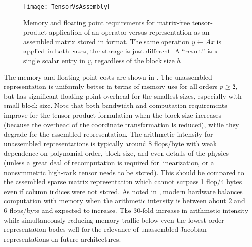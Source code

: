 \begin{figure}
  \centering
  \texttt{[image: TensorVsAssembly]}
  \caption{Memory and floating point requirements for matrix-free tensor-product application of an operator versus representation as an assembled matrix stored in \BAIJ[b] format.
    The same operation $y \gets A x$ is applied in both cases, the storage is just different.
    A ``result'' is a single scalar entry in $y$, regardless of the block size $b$.}\label{fig:tensorasm}
\end{figure}

The memory and floating point costs are shown in .
The unassembled representation is uniformly better in terms of memory use for all orders $p \ge 2$, but has significant floating point overhead for the smallest sizes, especially with small block size.
Note that both bandwidth and computation requirements improve for the tensor product formulation when the block size increases (because the overhead of the coordinate transformation is reduced), while they degrade for the assembled representation.
The arithmetic intensity for unassembled representations is typically around 8 flops/byte with weak dependence on polynomial order, block size, and even details of the physics (unless a great deal of recomputation is required for linearization, or a nonsymmetric high-rank tensor needs to be stored).
This should be compared to the assembled sparse matrix representation which cannot surpass 1 flop/4 bytes even if column indices were not stored.
As noted in , modern hardware balances computation with memory when the arithmetic intensity is between about 2 and 6 flops/byte and expected to increase.
The 30-fold increase in arithmetic intensity while simultaneously reducing memory traffic below even the lowest order representation bodes well for the relevance of unassembled Jacobian representations on future architectures.

